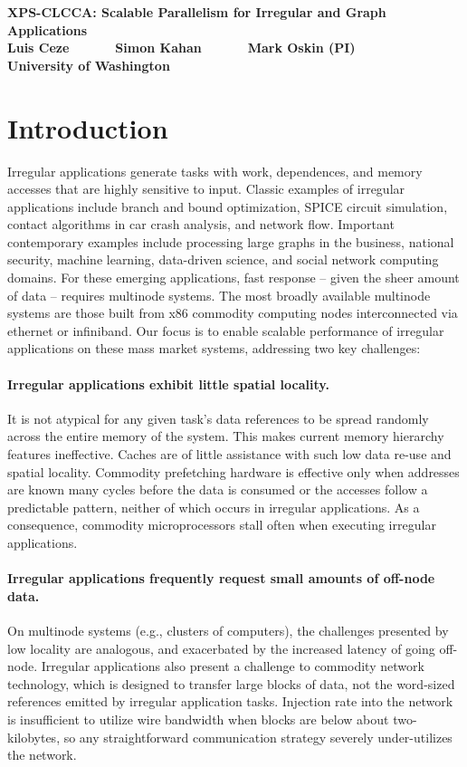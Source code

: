 


\begin{center}
  \textbf{\Large XPS-CLCCA: Scalable Parallelism for Irregular and Graph Applications}\\ \vspace{5mm}
  \textbf{Luis Ceze ~~~~~ Simon Kahan ~~~~~ Mark Oskin (PI)}\\
  \textbf{University of Washington}
\end{center}

\section{Introduction}

Irregular applications generate tasks with work, dependences, and memory
accesses that are highly sensitive to input. Classic examples of irregular
applications include branch and bound optimization, SPICE circuit simulation,
contact algorithms in car crash analysis, and network flow. Important
contemporary examples include processing large graphs in the business,
national security, machine learning, data-driven science, and social network
computing domains. For these emerging applications, fast response -- given the
sheer amount of data -- requires multinode systems. The most broadly available
multinode systems are those built from x86 commodity computing nodes
interconnected via ethernet or infiniband. Our focus is to enable scalable
performance of irregular applications on these mass market systems,
addressing two key challenges:

\paragraph{Irregular applications exhibit little spatial locality.} It is not
atypical for any given task's data references to be spread randomly across the
entire memory of the system. This makes current memory hierarchy features
ineffective. Caches are of little assistance with such low data re-use and
spatial locality. Commodity prefetching hardware is effective only when
addresses are known many cycles before the data is consumed or the accesses
follow a predictable pattern, neither of which occurs in irregular
applications. As a consequence, commodity microprocessors stall often when
executing irregular applications.

\paragraph{Irregular applications frequently request small amounts of off-node
data.} On multinode systems (e.g., clusters of computers), the challenges
presented by low locality are analogous, and exacerbated by the increased
latency of going off-node. Irregular applications also present a challenge to
commodity network technology, which is designed to transfer large blocks of
data, not the word-sized references emitted by irregular application tasks.
Injection rate into the network is insufficient to utilize wire bandwidth when
blocks are below about two-kilobytes, so any straightforward communication
strategy severely under-utilizes the network.

